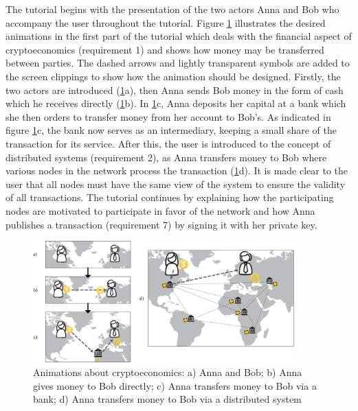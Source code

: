 The tutorial begins with the presentation of the two actors Anna and Bob who accompany the user throughout the tutorial. Figure \ref{fig:Animationline} illustrates the desired animations in the first part of the tutorial which deals with the financial aspect of cryptoeconomics (requirement 1) and shows how money may be transferred between parties. The dashed arrows and lightly transparent symbols are added to the screen clippings to show how the animation should be designed. Firstly, the two actors are introduced (\ref{fig:Animationline}a), then Anna sends Bob money in the form of cash which he receives directly (\ref{fig:Animationline}b). In \ref{fig:Animationline}c, Anna deposits her capital at a bank which she then orders to transfer money from her account to Bob's. As indicated in figure \ref{fig:Animationline}c, the bank now serves as an intermediary, keeping a small share of the transaction for its service. After this, the user is introduced to the concept of distributed systems (requirement 2), as Anna transfers money to Bob where various nodes in the network process the transaction (\ref{fig:Animationline}d). It is made clear to the user that all nodes must have the same view of the system to ensure the validity of all transactions. The tutorial continues by explaining how the participating nodes are motivated to participate in favor of the network and how Anna publishes a transaction (requirement 7) by signing it with her private key.

\begin{figure}
    \centering
      \includegraphics[width=0.9\textwidth]{latex-vorlage_v1.5/graphics/Animations2.png} 
    \caption{Animations about cryptoeconomics: a) Anna and Bob; b) Anna gives money to Bob directly; c) Anna transfers money to Bob via a bank; d) Anna transfers money to Bob via a distributed system}
    \label{fig:Animationline}
\end{figure}


